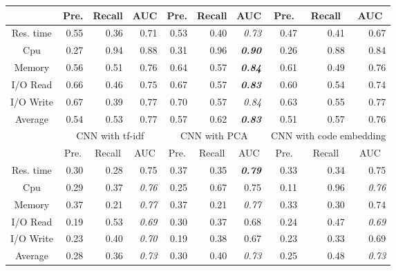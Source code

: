 \documentclass[10pt,journal,compsoc]{IEEEtran}
\begin{document}
\begin{table}
\begin{tabular}{|c|r|r|r|r|r|r|r|r|r|}
                  & \multicolumn{1}{c|}{Pre.} & \multicolumn{1}{c|}{Recall} & \multicolumn{1}{c|}{AUC} & \multicolumn{1}{c|}{Pre.} & \multicolumn{1}{c|}{Recall} & \multicolumn{1}{c|}{AUC} & \multicolumn{1}{c|}{Pre.} & \multicolumn{1}{c|}{Recall} & \multicolumn{1}{c|}{AUC} \\ \hline
Res. time         & 0.55 & 0.36   & 0.71& 0.53 & 0.40   & \textit{0.73}            & 0.47 & 0.41   & 0.67\\ \hline
Cpu               & 0.27 & 0.94   & 0.88& 0.31 & 0.96   & \textit{\textbf{0.90}}   & 0.26 & 0.88   & 0.84\\ \hline
Memory            & 0.56 & 0.51   & 0.76& 0.64 & 0.57   & \textit{\textbf{0.84}}   & 0.61 & 0.49   & 0.76\\ \hline
I/O Read          & 0.66 & 0.46   & 0.75& 0.67 & 0.57   & \textit{\textbf{0.83}}   & 0.60 & 0.54   & 0.74\\ \hline
I/O Write         & 0.67 & 0.39   & 0.77& 0.70 & 0.57   & \textit{0.84}            & 0.63 & 0.55   & 0.77\\ \hline
Average           & 0.54 & 0.53   & 0.77& 0.57 & 0.62   & \textit{\textbf{0.83}}   & 0.51 & 0.57   & 0.76\\ \hline
\multirow{2}{*}{} & \multicolumn{3}{c|}{CNN with tf-idf}     & \multicolumn{3}{c|}{CNN with PCA}        & \multicolumn{3}{c|}{CNN with code embedding}                  \\ \cline{2-10} 
                  & \multicolumn{1}{c|}{Pre.} & \multicolumn{1}{c|}{Recall} & \multicolumn{1}{c|}{AUC} & \multicolumn{1}{c|}{Pre.} & \multicolumn{1}{c|}{Recall} & \multicolumn{1}{c|}{AUC} & \multicolumn{1}{c|}{Pre.} & \multicolumn{1}{c|}{Recall} & \multicolumn{1}{c|}{AUC} \\ \hline
Res. time         & 0.30 & 0.28   & 0.75& 0.37 & 0.35   & \textit{\textbf{0.79}}   & 0.33 & 0.34   & 0.75\\ \hline
Cpu               & 0.29 & 0.37   & \textit{0.76}            & 0.25 & 0.67   & 0.75& 0.11 & 0.96   & \textit{0.76}            \\ \hline
Memory            & 0.37 & 0.21   & \textit{0.77}            & 0.37 & 0.21   & \textit{0.77}            & 0.33 & 0.30   & 0.74\\ \hline
I/O Read          & 0.19 & 0.53   & \textit{0.69}            & 0.30 & 0.37   & 0.68& 0.24 & 0.47   & \textit{0.69}            \\ \hline
I/O Write         & 0.23 & 0.40   & \textit{0.70}            & 0.19 & 0.38   & 0.67& 0.23 & 0.33   & 0.69\\ \hline
Average           & 0.28 & 0.36   & \textit{0.73}            & 0.30 & 0.40   & \textit{0.73}            & 0.25 & 0.48   & \textit{0.73}            \\ \hline
\end{tabular}
\label{tab:model_evaluation_cassandra}
\end{table}
\end{document}
